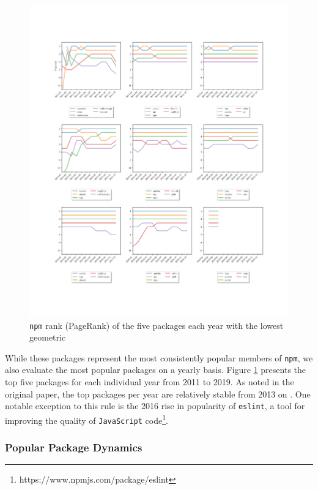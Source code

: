 \documentclass[10pt,conference]{IEEEtran}
\def\code#1{\texttt{#1}}
\begin{document}
\begin{figure}
  \includegraphics[width=1\textwidth]{figures/highest_ranked.pdf}
  \caption{\code{npm} rank (PageRank) of the five packages each year with the lowest geometric}
  \label{ranksByYear}
\end{figure}

While these packages represent the most consistently popular
members of \code{npm}, we also evaluate the most popular packages
on a yearly basis. Figure \ref{ranksByYear} presents the top five packages
for each individual year from 2011 to 2019. As noted in the original paper,
the top packages per year are relatively stable from 2013 on \cite{Wittern:2016}.
One notable exception to this rule is the 2016 rise in popularity of \code{eslint},
a tool for improving the quality of \code{JavaScript} code\footnote{https://www.npmjs.com/package/eslint}.





\subsubsection{Popular Package Dynamics}
\end{document}
